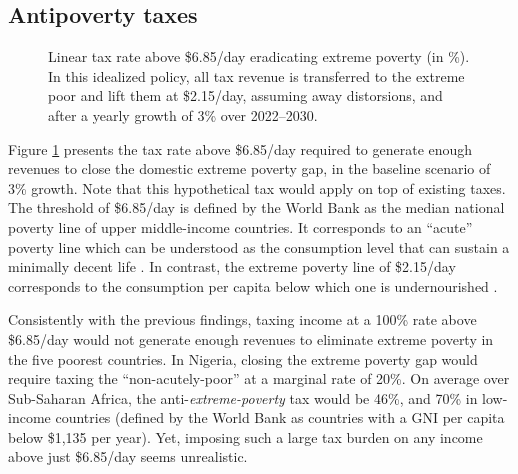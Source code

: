 \subsection{Antipoverty taxes}

\begin{figure}[b!]
  \caption[Anti-\textit{extreme-poverty} tax above \$6.85/day in 2030 after 3\% growth.]{Linear tax rate above \$6.85/day eradicating extreme poverty (in \%). In this idealized policy, all tax revenue is transferred to the extreme poor and lift them at \$2.15/day, assuming away distorsions, and after a yearly growth of 3\% over 2022--2030. 
  }\label{fig:antipoverty_tax_7}
\end{figure}

Figure \ref{fig:antipoverty_tax_7} presents the tax rate above \$6.85/day required to generate enough revenues to close the domestic extreme poverty gap, in the baseline scenario of 3\% growth. Note that this hypothetical tax would apply on top of existing taxes. The threshold of \$6.85/day is defined by the World Bank as the median national poverty line of upper middle-income countries. It corresponds to an ``acute'' poverty line which can be understood as the consumption level that can sustain a minimally decent life \citep{hickel_is_2019,kikstra_decent_2021}. In contrast, the extreme poverty line of \$2.15/day corresponds to the consumption per capita below which one is undernourished \citep{allen_absolute_2017}. 

Consistently with the previous findings, taxing income at a 100\% rate above \$6.85/day would not generate enough revenues to eliminate extreme poverty in the five poorest countries. In Nigeria, closing the extreme poverty gap would require taxing the ``non-acutely-poor'' at a marginal rate of 20\%. 
On average over Sub-Saharan Africa, the anti-\textit{extreme-poverty} tax would be 46\%, and 70\% in low-income countries (defined by the World Bank as countries with a GNI per capita below \$1,135 per year). Yet, imposing such a large tax burden on any income above just \$6.85/day seems unrealistic. 

